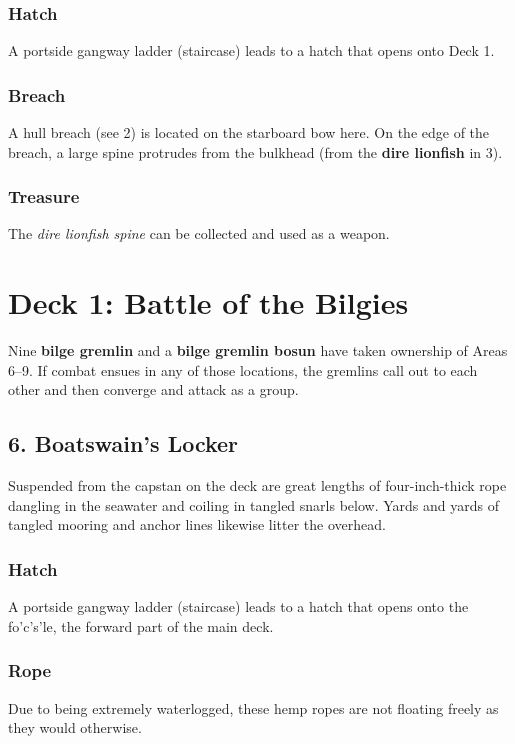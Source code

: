 \documentclass[10pt,a4paper,twoside,bg=print,twocolumn,openany,nodeprecatedcode]{dndbook}
\begin{document}
\subsubsection{Hatch}
A portside gangway ladder (staircase) leads to a hatch that opens onto Deck 1.

\subsubsection{Breach}
A hull breach (see 2) is located on the starboard bow here. On the edge of the breach, a large spine protrudes from the bulkhead (from the \textbf{dire lionfish} in 3).

\subsubsection{Treasure}
The \textit{dire lionfish spine} can be collected and used as a weapon.

\section{Deck 1: Battle of the Bilgies}
Nine \textbf{bilge gremlin} and a \textbf{bilge gremlin bosun} have taken ownership of Areas 6–9. If combat ensues in any of those locations, the gremlins call out to each other and then converge and attack as a group.

\subsection{6. Boatswain's Locker}
\begin{DndReadAloud}{}
Suspended from the capstan on the deck are great lengths of four-inch-thick rope dangling in the seawater and coiling in tangled snarls below. Yards and yards of tangled mooring and anchor lines likewise litter the overhead.

\end{DndReadAloud}

\subsubsection{Hatch}
A portside gangway ladder (staircase) leads to a hatch that opens onto the fo'c's'le, the forward part of the main deck.

\subsubsection{Rope}
Due to being extremely waterlogged, these hemp ropes are not floating freely as they would otherwise.
\end{document}
